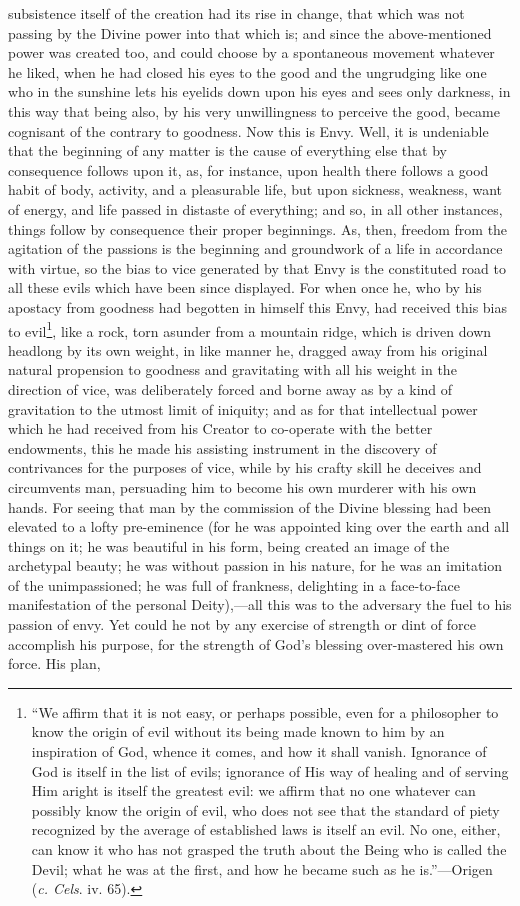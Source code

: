 subsistence itself of the creation had its rise in change, that which was not passing by the Divine power into that which is; and since the above-mentioned power was created too, and could choose by a spontaneous movement whatever he liked, when he had closed his eyes to the good and the ungrudging like one who in the sunshine lets his eyelids down upon his eyes and sees only darkness, in this way that being also, by his very unwillingness to perceive the good, became cognisant of the contrary to goodness. Now this is Envy. Well, it is undeniable that the beginning of any matter is the cause of everything else that by consequence follows upon it, as, for instance, upon health there follows a good habit of body, activity, and a pleasurable life, but upon sickness, weakness, want of energy, and life passed in distaste of everything; and so, in all other instances, things follow by consequence their proper beginnings. As, then, freedom from the agitation of the passions is the beginning and groundwork of a life in accordance with virtue, so the bias to vice generated by that Envy is the constituted road to all these evils which have been since displayed. For when once he, who by his apostacy from goodness had begotten in himself this Envy, had received this bias to evil\footnote{“We affirm that it is not easy, or perhaps possible, even for a philosopher to know the origin of evil without its being made known to him by an inspiration of God, whence it comes, and how it shall vanish. Ignorance of God is itself in the list of evils; ignorance of His way of healing and of serving Him aright is itself the greatest evil: we affirm that no one whatever can possibly know the origin of evil, who does not see that the standard of piety recognized by the average of established laws is itself an evil. No one, either, can know it who has not grasped the truth about the Being who is called the Devil; what he was at the first, and how he became such as he is.”—Origen (\emph{c. Cels}. iv. 65).}, like a rock, torn asunder from a mountain ridge, which is driven down headlong by its own weight, in like manner he, dragged away from his original natural propension to goodness and gravitating with all his weight in the direction of vice, was deliberately forced and borne away as by a kind of gravitation to the utmost limit of iniquity; and as for that intellectual power which he had received from his Creator to co-operate with the better endowments, this he made his assisting instrument in the discovery of contrivances for the purposes of vice, while by his crafty skill he deceives and circumvents man, persuading him to become his own murderer with his own hands. For seeing that man by the commission of the Divine blessing had been elevated to a lofty pre-eminence (for he was appointed king over the earth and all things on it; he was beautiful in his form, being created an image of the archetypal beauty; he was without passion in his nature, for he was an imitation of the unimpassioned; he was full of frankness, delighting in a face-to-face manifestation of the personal Deity),—all this was to the adversary the fuel to his passion of envy. Yet could he not by any exercise of strength or dint of force accomplish his purpose, for the strength of God’s blessing over-mastered his own force. His plan, 